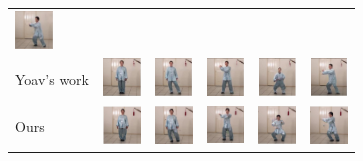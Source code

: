 \documentclass{article}
\begin{document}
\begin{table}[t]
\begin{center}
\begin{small}
\begin{sc}
\begin{tabular}{m{1.5cm}m{1.5cm}m{1.5cm}}
\includegraphics[width=1cm, height=1cm]{paper/images/3_FOMM_5.JPG}\\
Yoav's work & \includegraphics[width=1cm, height=1cm]{paper/images/4_YOAV_1.JPG} & \includegraphics[width=1cm, height=1cm]{paper/images/4_YOAV_2.JPG} &
\includegraphics[width=1cm, height=1cm]{paper/images/4_YOAV_3.JPG}&
\includegraphics[width=1cm, height=1cm]{paper/images/4_YOAV_4.JPG}&
\includegraphics[width=1cm, height=1cm]{paper/images/4_YOAV_5.JPG}\\
Ours & \includegraphics[width=1cm, height=1cm]{paper/images/5_OURS_1.JPG} & \includegraphics[width=1cm, height=1cm]{paper/images/5_OURS_2.JPG} &
\includegraphics[width=1cm, height=1cm]{paper/images/5_OURS_3.JPG}&
\includegraphics[width=1cm, height=1cm]{paper/images/5_OURS_4.JPG}&
\includegraphics[width=1cm, height=1cm]{paper/images/5_OURS_5.JPG}\\
\bottomrule
\end{tabular}
\end{sc}
\end{small}
\end{center}
\vskip -0.1in
\end{table}
\end{document}

